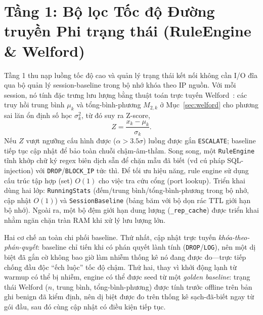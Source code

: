 \section{Tầng 1: Bộ lọc Tốc độ Đường truyền Phi trạng thái (RuleEngine \& Welford)}
Tầng 1 thu nạp luồng tốc độ cao và quản lý trạng thái kết nối không cần I/O đĩa qua bộ quản lý session-baseline trong bộ nhớ khóa theo IP nguồn. Với mỗi session, nó tính đặc trưng lưu lượng bằng thuật toán trực tuyến Welford~\cite{welford1962}: các truy hồi trung bình $\mu_k$ và tổng-bình-phương $M_{2,k}$ ở Mục~\ref{sec:welford} cho phương sai lăn ổn định số học $\sigma_k^2$, từ đó suy ra Z-score,
\begin{equation}
    Z = \frac{x_k - \mu_k}{\sigma_k}.
\end{equation}
Nếu $Z$ vượt ngưỡng cấu hình được ($\alpha>3.5\sigma$) luồng được gắn \texttt{ESCALATE}; baseline tiếp tục cập nhật để bảo toàn chuỗi chậm-âm-thầm. Song song, một \texttt{RuleEngine} tĩnh khớp chữ ký regex biên dịch sẵn để chặn mẫu đã biết (vd cú pháp SQL-injection) với \texttt{DROP}/\texttt{BLOCK\_IP} tức thì. Để tối ưu hiệu năng, rule engine sử dụng cấu trúc tập hợp (set) $O(1)$ cho việc tra cứu cổng (port lookup). Triển khai dùng hai lớp: \texttt{RunningStats} (đếm/trung bình/tổng-bình-phương trong bộ nhớ, cập nhật $O(1)$) và \texttt{SessionBaseline} (bảng băm với bộ dọn rác TTL giới hạn bộ nhớ). Ngoài ra, một bộ đệm giới hạn dung lượng (\texttt{\_rep\_cache}) được triển khai nhằm ngăn chặn tràn RAM khi xử lý lưu lượng lớn.

Hai cơ chế an toàn chi phối baseline. Thứ nhất, cập nhật trực tuyến \emph{khóa-theo-phán-quyết}: baseline chỉ tiến khi có phán quyết lành tính (\texttt{DROP}/\texttt{LOG}), nên một dị biệt đã gắn cờ không bao giờ làm nhiễm thống kê nó đang được đo---trực tiếp chống đầu độc ``ếch luộc'' tốc độ chậm. Thứ hai, thay vì khởi động lạnh từ warmup có thể bị nhiễm, engine có thể được seed từ một \emph{golden baseline}: trạng thái Welford ($n$, trung bình, tổng-bình-phương) được tính trước offline trên bản ghi benign đã kiểm định, nên dị biệt được đo trên thống kê sạch-đã-biết ngay từ gói đầu, sau đó cùng cập nhật có điều kiện tiếp tục.

